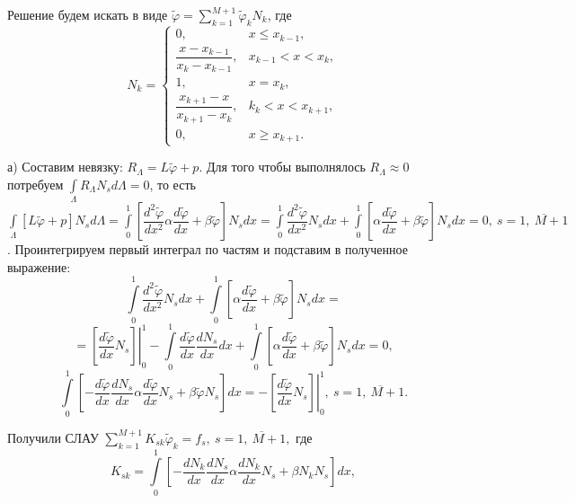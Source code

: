 \documentclass[14pt]{extreport}
\begin{document}
Решение будем искать в виде $\widetilde{\varphi}=\sum\limits_{k=1}^{M+1}\widetilde{\varphi}_kN_k$, где \begin{equation*}
N_k = 
\begin{cases}
0, & x \leq x_{k-1},\\
\dfrac{x-x_{k-1}}{x_{k}-x_{k-1}}, & x_{k-1}<x<x_{k},\\
1, & x=x_k,\\
\dfrac{x_{k+1}-x}{x_{k+1}-x_k}, & k_k<x<x_{k+1},\\
0, & x \geq x_{k+1}.
\end{cases}
\end{equation*}

а) Составим невязку: $R_\Lambda=L\widetilde{\varphi}+p$. Для того чтобы выполнялось $R_\Lambda\approx0$ потребуем $\int\limits_{\Lambda}R_\Lambda N_sd\Lambda=0$, то есть $\int\limits_{\Lambda}[L\widetilde{\varphi}+p] N_sd\Lambda=\int\limits_0^1\left[\dfrac{d^2\widetilde{\varphi}}{dx^2}\alpha\dfrac{d\widetilde{\varphi}}{dx}+\beta\widetilde{\varphi}\right]N_sdx=\int\limits_0^1\dfrac{d^2\widetilde{\varphi}}{dx^2}N_sdx+\int\limits_0^1\left[\alpha\dfrac{d\widetilde{\varphi}}{dx}+\beta\widetilde{\varphi}\right]N_sdx=0,\ s=\overline{1,\ M+1}$. Проинтегрируем первый интеграл по частям и подставим в полученное выражение: $$\int\limits_0^1\dfrac{d^2\widetilde{\varphi}}{dx^2}N_sdx+\int\limits_0^1\left[\alpha\dfrac{d\widetilde{\varphi}}{dx}+\beta\widetilde{\varphi}\right]N_sdx=$$
$$=\left.\left[\dfrac{d\widetilde{\varphi}}{dx}N_s\right]\right|_0^1-\int\limits_0^1\dfrac{d\widetilde{\varphi}}{dx}\dfrac{dN_s}{dx}dx+\int\limits_0^1\left[\alpha\dfrac{d\widetilde{\varphi}}{dx}+\beta\widetilde{\varphi}\right]N_sdx=0,$$
$$\int\limits_0^1\left[-\dfrac{d\widetilde{\varphi}}{dx}\dfrac{dN_s}{dx}\alpha\dfrac{d\widetilde{\varphi}}{dx}N_s+\beta\widetilde{\varphi}N_s\right]dx=-\left.\left[\dfrac{d\widetilde{\varphi}}{dx}N_s\right]\right|_0^1,\ s=\overline{1,\ M+1}.$$

Получили СЛАУ $\sum\limits_{k=1}^{M+1}K_{sk}\widetilde{\varphi}_k=f_s, \ s=\overline{1,\ M+1},$ где $$K_{sk}=\int\limits_0^1\left[-\dfrac{dN_k}{dx}\dfrac{dN_s}{dx}\alpha\dfrac{dN_k}{dx}N_s+ \beta N_kN_s\right]dx,$$
\end{document}
